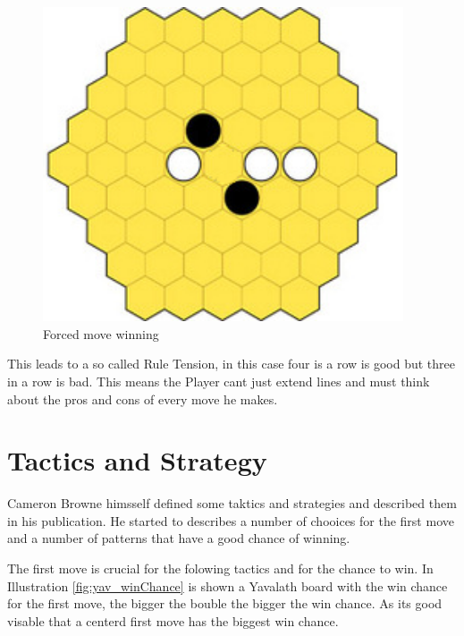 \documentclass[english]{report}
\begin{document}
\begin{figure}[ht]
\centering
\includegraphics[width=0.95\textwidth]{Abbildungen/yav_forceMove.png}
\caption[Forced move winning, Source:\cite{yvalath
}]{Forced move winning}
\label{fig:yav_forceMove}
\end{figure}


This leads to a so called Rule Tension, in this case four is a row is good but three in a row is bad. This means the Player cant just extend lines and must think about the pros and cons of every move he makes.\cite{yvalath}

\section{Tactics and Strategy}
Cameron Browne himsself defined some taktics and strategies and described them in his publication. He started to describes a number of chooices for the first move and a number of patterns that have a good chance of winning.


The first move is crucial for the folowing tactics and for the chance to win.
In Illustration \ref{fig:yav_winChance} is shown a Yavalath board with the win chance for the first move, the bigger the bouble the bigger the win chance. As its good visable that a centerd first move has the biggest win chance.\cite{yvalath}
\end{document}
